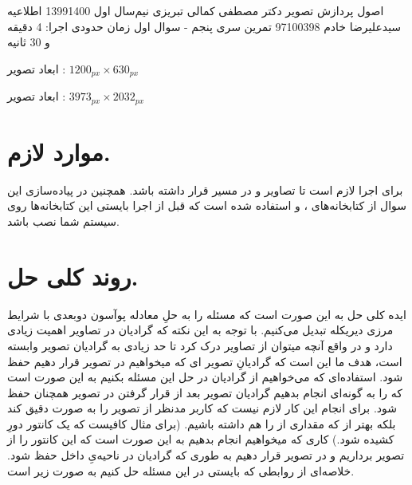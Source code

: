 \documentclass[a4paper,12pt]{article}
\begin{document}
	\handout
	{اصول پردازش تصویر}
	{دکتر مصطفی کمالی تبریزی}
	{نیم‌سال اول 1399\lr{-}1400}
	{اطلاعیه}
	{سیدعلیرضا خادم}
	{97100398}
	{تمرین سری پنجم - سوال اول}
	زمان حدودی اجرا: 4 دقیقه و 30 ثانیه 
	
	ابعاد تصویر
	:
	$ 1200_{px} \times 630_{px} $
	
	ابعاد تصویر
	:
	$ 3973_{px} \times 2032_{px} $
	
	\section*{موارد لازم.}
	برای اجرا لازم است تا تصاویر 
	و
	در مسیر
	قرار داشته باشد. همچنین در پیاده‌سازی این سوال از کتابخانه‌های 
	،
	و
	استفاده شده است که قبل از اجرا بایستی این کتابخانه‌ها روی سیستم شما نصب باشد.
	\section*{روند کلی حل.}
	ایده کلی حل به این صورت است که مسئله را به حلِ معادله پوآسون دوبعدی با شرایط مرزی دیریکله تبدیل می‌کنیم. با توجه به این نکته که گرادیان در تصاویر اهمیت زیادی دارد و در واقع آنچه میتوان از تصاویر درک کرد تا حد زیادی به گرادیان تصویر وابسته است،  هدف ما این است که  گرادیانِ تصویر
	ای 
	که میخواهیم در تصویر 
	قرار دهیم حفظ شود. استفاده‌ای که می‌خواهیم از گرادیان در حل این مسئله بکنیم به این صورت است که 
	را به گونه‌ای انجام بدهیم گرادیان تصویر 
	بعد از قرار گرفتن در تصویر
	همچنان حفظ شود. برای انجام این کار لازم نیست که کاربر 
	مدنظر از تصویر
	را به صورت دقیق 
	کند بلکه بهتر از که مقداری از 
	را هم داشته باشیم. (برای مثال کافیست که یک کانتور دورِ 
	کشیده شود.)
	 کاری که میخواهیم انجام بدهیم به این صورت است که این کانتور را از تصویر 
	برداریم و در تصویر
	قرار دهیم به طوری که گرادیان در ناحیه‌یِ داخل 
	حفظ شود. خلاصه‌ای از روابطی که بایستی در این مسئله حل کنیم به صورت زیر است.
	
\end{document}
